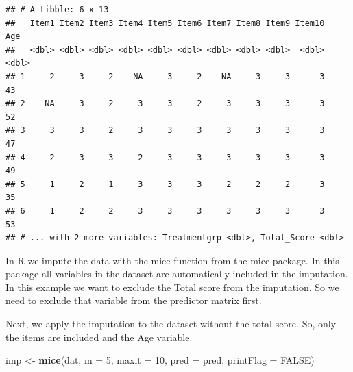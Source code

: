 \documentclass[
]{book}
\newenvironment{Shaded}{\begin{snugshade}}{\end{snugshade}}
\newcommand{\CommentTok}[1]{\textcolor[rgb]{0.56,0.35,0.01}{\textit{#1}}}
\newcommand{\DataTypeTok}[1]{\textcolor[rgb]{0.13,0.29,0.53}{#1}}
\newcommand{\DecValTok}[1]{\textcolor[rgb]{0.00,0.00,0.81}{#1}}
\newcommand{\KeywordTok}[1]{\textcolor[rgb]{0.13,0.29,0.53}{\textbf{#1}}}
\newcommand{\NormalTok}[1]{#1}
\newcommand{\OperatorTok}[1]{\textcolor[rgb]{0.81,0.36,0.00}{\textbf{#1}}}
\newcommand{\OtherTok}[1]{\textcolor[rgb]{0.56,0.35,0.01}{#1}}
\newcommand{\StringTok}[1]{\textcolor[rgb]{0.31,0.60,0.02}{#1}}
\begin{document}
\begin{verbatim}
## # A tibble: 6 x 13
##   Item1 Item2 Item3 Item4 Item5 Item6 Item7 Item8 Item9 Item10   Age
##   <dbl> <dbl> <dbl> <dbl> <dbl> <dbl> <dbl> <dbl> <dbl>  <dbl> <dbl>
## 1     2     3     2    NA     3     2    NA     3     3      3    43
## 2    NA     3     2     3     3     2     3     3     3      3    52
## 3     3     3     2     3     3     3     3     3     3      3    47
## 4     2     3     3     2     3     3     3     3     3      3    49
## 5     1     2     1     3     3     3     2     2     2      3    35
## 6     1     2     2     3     3     3     3     3     3      3    53
## # ... with 2 more variables: Treatmentgrp <dbl>, Total_Score <dbl>
\end{verbatim}

In R we impute the data with the mice function from the mice package. In
this package all variables in the dataset are automatically included in
the imputation. In this example we want to exclude the Total score from
the imputation. So we need to exclude that variable from the predictor
matrix first.

\begin{Shaded}
\end{Shaded}

Next, we apply the imputation to the dataset without the total score.
So, only the items are included and the Age variable.

\begin{Shaded}
\begin{Highlighting}[]
\NormalTok{imp <-}\StringTok{ }\KeywordTok{mice}\NormalTok{(dat, }\DataTypeTok{m =} \DecValTok{5}\NormalTok{, }\DataTypeTok{maxit =} \DecValTok{10}\NormalTok{, }\DataTypeTok{pred =}\NormalTok{ pred, }\DataTypeTok{printFlag =} \OtherTok{FALSE}\NormalTok{)}
\end{Highlighting}
\end{Shaded}
\end{document}
